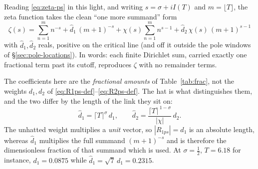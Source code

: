 \documentclass[11pt]{article}
\theoremstyle{definition}
\begin{document}
\begin{table}[htbp]
\centering
{}
\caption{Each remainder is the $(m+1)$st (``next'') summand of its Dirichlet sum,
scaled by a real fractional amount. The final column is the resulting
\emph{partial summand} $=$ (fractional amount) $\times$ (next summand), which
simplifies to $R_{1ps}$ and $R_{2ps}$ respectively.}
\label{tab:frac}
\end{table}

Reading \eqref{eq:zeta-ps} in this light, and writing $s=\sigma+iI(T)$ and
$m=\lfloor T\rfloor$, the zeta function takes the clean ``one more summand'' form
\begin{equation}\label{eq:zeta-clean}
\boxed{\;
\zeta(s)=\sum_{n=1}^{m} n^{-s} + \hat d_1\,(m+1)^{-s}
        + \chi(s)\sum_{n=1}^{m} n^{s-1} + \hat d_2\,\chi(s)\,(m+1)^{s-1}
\;}
\end{equation}
with $\hat d_1,\hat d_2$ reals, positive on the critical line (and off it
outside the pole windows of \S\ref{sec:pole-locations}). In words: each finite Dirichlet sum,
carried exactly one fractional term past its cutoff, reproduces $\zeta$
with no remainder terms.

The coefficients here are the \emph{fractional amounts} of
Table~\ref{tab:frac}, not the weights $d_1,d_2$ of
\eqref{eq:R1ps-def}--\eqref{eq:R2ps-def}. The hat is what distinguishes them,
and the two differ by the length of the link they sit on:
\begin{equation}\label{eq:frac-vs-weight}
\hat d_1=\lceil T\rceil^{\sigma}\,d_1,
\qquad
\hat d_2=\frac{\lceil T\rceil^{\,1-\sigma}}{|\chi|}\,d_2.
\end{equation}
The unhatted weight multiplies a \emph{unit} vector, so $|R_{1ps}|=d_1$ is an
absolute length, whereas $\hat d_1$ multiplies the full summand $(m+1)^{-s}$
and is therefore the dimensionless fraction of that summand which is used. At
$\sigma=\tfrac12$, $T=6.18$ for instance, $d_1=0.0875$ while
$\hat d_1=\sqrt7\,d_1=0.2315$.
\end{document}
